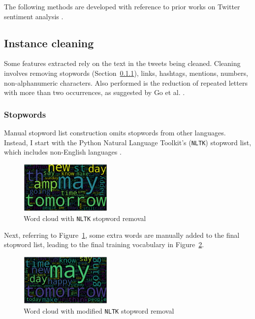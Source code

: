 \documentclass[11pt]{article}
\begin{document}
The following methods are developed with reference to prior works on {T}witter sentiment analysis \cite{go09,nltk,robustnoisy10}.

\subsection{Instance cleaning}

Some features extracted rely on the text in the tweets being cleaned.
Cleaning involves removing stopwords (Section~\ref{sec:stopwords}), links, hashtags, mentions, numbers, non-alphanumeric characters.
Also performed is the reduction of repeated letters with more than two occurrences, as suggested by Go et al. .

\subsubsection{Stopwords}\label{sec:stopwords}

Manual stopword list construction omits stopwords from other languages. 
Instead, I start with the {P}ython Natural Language Toolkit's (\texttt{NLTK}) stopword list, which includes non-English languages \cite{nltk}.

\begin{figure}[H]
	\centering
	\includegraphics[width = 0.4\textwidth]{wc/all-clean-nltk.png}
	\caption{Word cloud with \texttt{NLTK} stopword removal}
	\label{fig:wc-nltk}
\end{figure}

Next, referring to Figure~\ref{fig:wc-nltk}, some extra words are manually added to the final stopword list, 
leading to the final training vocabulary in Figure~\ref{fig:wc-final}.

\begin{figure}[H]
	\centering
	\includegraphics[width = 0.4\textwidth]{wc/all-clean-final.png}
	\caption{Word cloud with modified \texttt{NLTK} stopword removal}
	\label{fig:wc-final}
\end{figure} 
\end{document}
